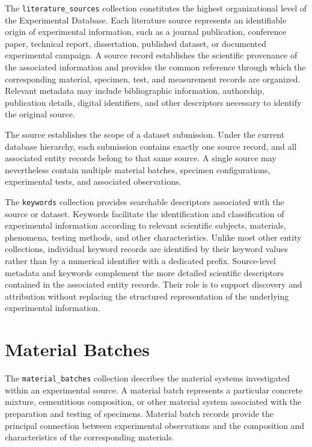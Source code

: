 The \texttt{literature\_sources} collection
constitutes the highest organizational level
of the Experimental Database.
Each literature source represents an identifiable
origin of experimental information, such as a
journal publication, conference paper, technical
report, dissertation, published dataset, or
documented experimental campaign.
A source record establishes the scientific
provenance of the associated information and
provides the common reference through which
the corresponding material, specimen, test,
and measurement records are organized.
Relevant metadata may include bibliographic
information, authorship, publication details,
digital identifiers, and other descriptors
necessary to identify the original source.

The source establishes the scope of a dataset
submission. Under the current database hierarchy,
each submission contains exactly one source record,
and all associated entity records belong to
that same source.
A single source may nevertheless contain
multiple material batches, specimen configurations,
experimental tests, and associated observations.

The \texttt{keywords} collection provides
searchable descriptors associated with the
source or dataset. Keywords facilitate the
identification and classification of experimental
information according to relevant scientific
subjects, materials, phenomena, testing methods,
and other characteristics.
Unlike most other entity collections, individual
keyword records are identified by their keyword
values rather than by a numerical identifier
with a dedicated prefix.
Source-level metadata and keywords complement
the more detailed scientific descriptors
contained in the associated entity records.
Their role is to support discovery and
attribution without replacing the structured
representation of the underlying experimental
information.


\section{Material Batches}

The \texttt{material\_batches} collection
describes the material systems investigated
within an experimental source.
A material batch represents a particular
concrete mixture, cementitious composition,
or other material system associated with
the preparation and testing of specimens.
Material batch records provide the principal
connection between experimental observations
and the composition and characteristics of
the corresponding materials.

